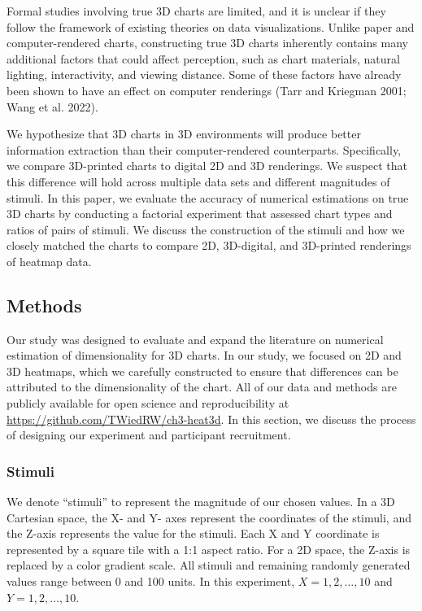 \documentclass[
  letterpaper,
  DIV=11,
  numbers=noendperiod]{scrartcl}
\begin{document}
Formal studies involving true 3D charts are limited, and it is unclear
if they follow the framework of existing theories on data
visualizations. Unlike paper and computer-rendered charts, constructing
true 3D charts inherently contains many additional factors that could
affect perception, such as chart materials, natural lighting,
interactivity, and viewing distance. Some of these factors have already
been shown to have an effect on computer renderings (Tarr and Kriegman
2001; Wang et al. 2022).

We hypothesize that 3D charts in 3D environments will produce better
information extraction than their computer-rendered counterparts.
Specifically, we compare 3D-printed charts to digital 2D and 3D
renderings. We suspect that this difference will hold across multiple
data sets and different magnitudes of stimuli. In this paper, we
evaluate the accuracy of numerical estimations on true 3D charts by
conducting a factorial experiment that assessed chart types and ratios
of pairs of stimuli. We discuss the construction of the stimuli and how
we closely matched the charts to compare 2D, 3D-digital, and 3D-printed
renderings of heatmap data.

\subsection{Methods}\label{methods}

Our study was designed to evaluate and expand the literature on
numerical estimation of dimensionality for 3D charts. In our study, we
focused on 2D and 3D heatmaps, which we carefully constructed to ensure
that differences can be attributed to the dimensionality of the chart.
All of our data and methods are publicly available for open science and
reproducibility at \url{https://github.com/TWiedRW/ch3-heat3d}. In this
section, we discuss the process of designing our experiment and
participant recruitment.

\subsubsection{Stimuli}\label{stimuli}

We denote ``stimuli'' to represent the magnitude of our chosen values.
In a 3D Cartesian space, the X- and Y- axes represent the coordinates of
the stimuli, and the Z-axis represents the value for the stimuli. Each X
and Y coordinate is represented by a square tile with a 1:1 aspect
ratio. For a 2D space, the Z-axis is replaced by a color gradient scale.
All stimuli and remaining randomly generated values range between 0 and
100 units. In this experiment, \(X=1, 2, \dots,10\) and
\(Y=1, 2,\dots,10\).
\end{document}
